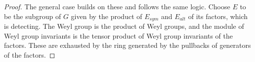 \documentclass{article}
\theoremstyle{plain}
\theoremstyle{definition}
\newcommand{\dfh}[1]{ \color{blue} DFH: { #1} \color{black}}
\begin{document}
\begin{proof}
    The general case builds on these and follows the same logic.  Choose $E$ to be the subgroup of $G$ given by the product of $E_{sym}$ and $E_{alt}$
    of its factors, which is detecting.
    The Weyl group is the product of Weyl groups, and
    the module of 
    Weyl group invariants is the tensor product of Weyl group
    invariants of the factors. These are exhausted by the ring generated
    by the pullbacks of generators of the factors.
 \end{proof}   
\end{document}
